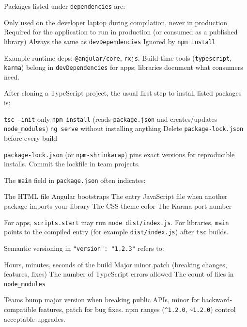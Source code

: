 \question[4]
Packages listed under \texttt{dependencies} are:
\begin{choices}
  \choice Only used on the developer laptop during compilation, never in production
  \CorrectChoice Required for the application to run in production (or consumed as a published library)
  \choice Always the same as \texttt{devDependencies}
  \choice Ignored by \texttt{npm install}
\end{choices}
\begin{solution}
  Example runtime deps: \texttt{@angular/core}, \texttt{rxjs}. Build-time tools (\texttt{typescript}, \texttt{karma}) belong in \texttt{devDependencies} for apps; libraries document what consumers need.
\end{solution}

\question[4]
After cloning a TypeScript project, the usual first step to install listed packages is:
\begin{choices}
  \choice \texttt{tsc --init} only
  \CorrectChoice \texttt{npm install} (reads \texttt{package.json} and creates/updates \texttt{node\_modules})
  \choice \texttt{ng serve} without installing anything
  \choice Delete \texttt{package-lock.json} before every build
\end{choices}
\begin{solution}
  \texttt{package-lock.json} (or \texttt{npm-shrinkwrap}) pins exact versions for reproducible installs. Commit the lockfile in team projects.
\end{solution}

\question[4]
The \texttt{main} field in \texttt{package.json} often indicates:
\begin{choices}
  \choice The HTML file Angular bootstraps
  \CorrectChoice The entry JavaScript file when another package imports your library
  \choice The CSS theme color
  \choice The Karma port number
\end{choices}
\begin{solution}
  For apps, \texttt{scripts.start} may run \texttt{node dist/index.js}. For libraries, \texttt{main} points to the compiled entry (for example \texttt{dist/index.js}) after \texttt{tsc} builds.
\end{solution}

\question[4]
Semantic versioning in \texttt{"version": "1.2.3"} refers to:
\begin{choices}
  \choice Hours, minutes, seconds of the build
  \CorrectChoice Major.minor.patch (breaking changes, features, fixes)
  \choice The number of TypeScript errors allowed
  \choice The count of files in \texttt{node\_modules}
\end{choices}
\begin{solution}
  Teams bump major version when breaking public APIs, minor for backward-compatible features, patch for bug fixes. npm ranges (\texttt{\^{}1.2.0}, \texttt{\~{}1.2.0}) control acceptable upgrades.
\end{solution}

